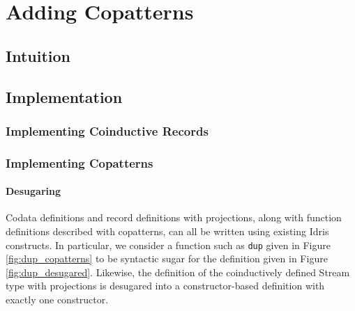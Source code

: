\chapter{Adding Copatterns}
\label{sec:adding_copatterns}
\section{Intuition}

\section{Implementation}

\subsection{Implementing Coinductive Records}


\subsection{Implementing Copatterns}

\subsubsection{Desugaring}
Codata definitions and record definitions with projections, along with function definitions described with copatterns, can all be written using existing Idris constructs. In particular, we consider a function such as \texttt{dup} given in Figure\,\ref{fig:dup_copatterns} to be syntactic sugar for the definition given in Figure\,\ref{fig:dup_desugared}. Likewise, the definition of the coinductively defined Stream type with projections is desugared into a constructor-based definition with exactly one constructor.

